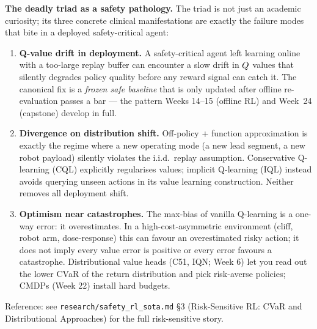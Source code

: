 \documentclass[11pt,oneside]{scrbook}
\begin{document}
\begin{safetyangle}
\textbf{The deadly triad as a safety pathology.}
The triad is not just an academic curiosity; its three concrete clinical manifestations
are exactly the failure modes that bite in a deployed safety-critical agent:

\begin{enumerate}
  \item \textbf{Q-value drift in deployment.} A safety-critical agent left learning
    online with a too-large replay buffer can encounter a slow drift in $Q$ values
    that silently degrades policy quality before any reward signal can catch it. The
    canonical fix is a \emph{frozen safe baseline} that is only updated after offline
    re-evaluation passes a bar --- the pattern Weeks 14--15 (offline RL) and Week~24
    (capstone) develop in full.
  \item \textbf{Divergence on distribution shift.} Off-policy + function approximation is
    exactly the regime where a new operating mode (a new lead segment, a new robot
    payload) silently violates the i.i.d.\ replay assumption. Conservative Q-learning (CQL) explicitly regularises values; implicit
    Q-learning (IQL) instead avoids querying unseen actions in its value
    learning construction. Neither removes all deployment shift.
  \item \textbf{Optimism near catastrophes.} The max-bias of vanilla Q-learning is a
    one-way error: it overestimates. In a high-cost-asymmetric environment (cliff, robot
    arm, dose-response) this can favour an overestimated risky action; it does not imply every value
    error is positive or every error favours a catastrophe. Distributional value heads (C51, IQN; Week 6) let you read out the
    lower CVaR of the return distribution and pick risk-averse policies; CMDPs (Week 22)
    install hard budgets.
\end{enumerate}
Reference: see \texttt{research/safety\_rl\_sota.md} \S3 (Risk-Sensitive RL: CVaR and
Distributional Approaches) for the full risk-sensitive story.
\end{safetyangle}
\end{document}
